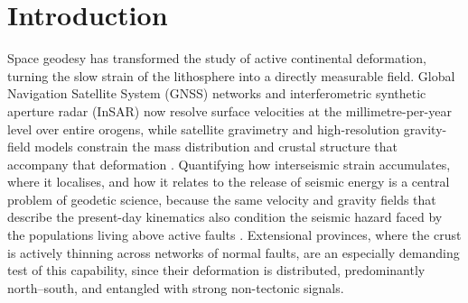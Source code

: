\documentclass[pdflatex,sn-mathphys-num]{sn-jnl}%
\theoremstyle{thmstyleone}%
\theoremstyle{thmstyletwo}%
\theoremstyle{thmstylethree}%
\begin{document}

\maketitle

\section{Introduction}\label{sec1}
Space geodesy has transformed the study of active continental deformation, turning
the slow strain of the lithosphere into a directly measurable field. Global
Navigation Satellite System (GNSS) networks and interferometric synthetic aperture
radar (InSAR) now resolve surface velocities at the millimetre-per-year level over
entire orogens, while satellite gravimetry and high-resolution gravity-field models
constrain the mass distribution and crustal structure that accompany that
deformation \cite{Wright2004,MassonnetFeigl1998,Burgmann2000,Elliott2016,Tapley2004,Pavlis2012}. Quantifying how interseismic
strain accumulates, where it localises, and how it relates to the release of
seismic energy is a central problem of geodetic science, because the same velocity
and gravity fields that describe the present-day kinematics also condition the
seismic hazard faced by the populations living above active faults
\cite{Hussain2018,Reilinger2006,Lemenkova202316,Weiss2020,Ergintav2023}. Extensional provinces, where the
crust is actively thinning across networks of normal faults, are an especially
demanding test of this capability, since their deformation is distributed,
predominantly north--south, and entangled with strong non-tectonic signals.
\end{document}
